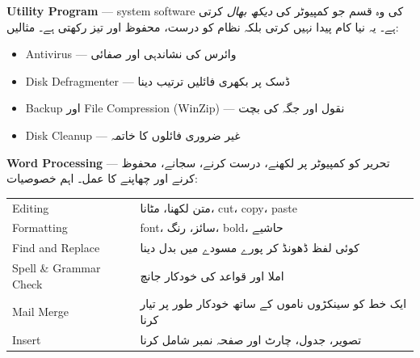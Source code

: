 \begin{hal}
\textbf{\textenglish{Utility Program}} --- \textenglish{system software} کی وہ
قسم جو کمپیوٹر کی \emph{دیکھ بھال} کرتی ہے۔ یہ نیا کام پیدا نہیں کرتی بلکہ
نظام کو درست، محفوظ اور تیز رکھتی ہے۔ مثالیں:

\begin{itemize}\setlength{\itemsep}{1pt}
  \item \textenglish{Antivirus} --- وائرس کی نشاندہی اور صفائی
  \item \textenglish{Disk Defragmenter} --- ڈسک پر بکھری فائلیں ترتیب دینا
  \item \textenglish{Backup} اور \textenglish{File Compression}
        (\textenglish{WinZip}) --- نقول اور جگہ کی بچت
  \item \textenglish{Disk Cleanup} --- غیر ضروری فائلوں کا خاتمہ
\end{itemize}

\medskip
\textbf{\textenglish{Word Processing}} --- تحریر کو کمپیوٹر پر لکھنے، درست
کرنے، سجانے، محفوظ کرنے اور چھاپنے کا عمل۔ اہم خصوصیات:

\begin{center}
\begin{tabular}{@{}p{5.2cm} p{9.0cm}@{}}
\toprule
\textenglish{Editing} & متن لکھنا، مٹانا، \textenglish{cut}، \textenglish{copy}، \textenglish{paste} \\
\textenglish{Formatting} & \textenglish{font}، سائز، رنگ، \textenglish{bold}، حاشیے \\
\textenglish{Find and Replace} & کوئی لفظ ڈھونڈ کر پورے مسودے میں بدل دینا \\
\textenglish{Spell \& Grammar Check} & املا اور قواعد کی خودکار جانچ \\
\textenglish{Mail Merge} & ایک خط کو سینکڑوں ناموں کے ساتھ خودکار طور پر تیار کرنا \\
\textenglish{Insert} & تصویر، جدول، چارٹ اور صفحہ نمبر شامل کرنا \\
\bottomrule
\end{tabular}
\end{center}

\end{hal}

